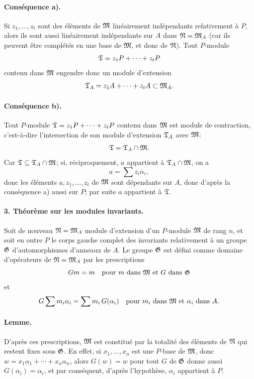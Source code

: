 \paragraph{Conséquence a).}
Si \(z_1,\ldots,z_t\) sont des éléments de \(\mathfrak M\) linéairement indépendants relativement à \(P\), alors ils sont aussi linéairement indépendants sur \(A\) dans \(\mathfrak N=\mathfrak M_A\) (car ils peuvent être complétés en une base de \(\mathfrak M\), et donc de \(\mathfrak N\)). Tout \(P\)-module
\[
        \mathfrak T=z_1P+\cdots+z_tP
\]
contenu dans \(\mathfrak M\) engendre donc un module d'extension
\[
        \mathfrak T_A=z_1A+\cdots+z_tA\subset \mathfrak M_A.
\]

\paragraph{Conséquence b).}
Tout \(P\)-module \(\mathfrak T=z_1P+\cdots+z_tP\) contenu dans \(\mathfrak M\) est module de contraction, c'est-à-dire l'intersection de son module d'extension \(\mathfrak T_A\) avec \(\mathfrak M\):
\[
        \mathfrak T=\mathfrak T_A\cap\mathfrak M .
\]
Car \(\mathfrak T\subseteq \mathfrak T_A\cap\mathfrak M\); si, réciproquement, \(a\) appartient à \(\mathfrak T_A\cap\mathfrak M\), on a
\[
        a=\sum z_i\alpha_i,
\]
donc les éléments \(a,z_1,\ldots,z_t\) de \(\mathfrak M\) sont dépendants sur \(A\), donc d'après la conséquence a) aussi sur \(P\); par suite \(a\) appartient à \(\mathfrak T\).

\paragraph{3. Théorème sur les modules invariants.}
Soit de nouveau \(\mathfrak N=\mathfrak M_A\) module d'extension d'un \(P\)-module \(\mathfrak M\) de rang \(n\), et soit en outre \(P\) le corps gauche complet des invariants relativement à un groupe \(\mathfrak G\) d'automorphismes d'anneaux de \(A\). Le groupe \(\mathfrak G\) est défini comme domaine d'opérateurs de \(\mathfrak N=\mathfrak M_A\) par les prescriptions
\[
        Gm=m\quad\text{pour }m\text{ dans }\mathfrak M\text{ et }G\text{ dans }\mathfrak G
\]
et
\[
        G\sum m_i\alpha_i=\sum m_i\,G(\alpha_i)
        \quad\text{pour }m_i\text{ dans }\mathfrak M\text{ et }\alpha_i\text{ dans }A.
\]

\paragraph{Lemme.}
D'après ces prescriptions, \(\mathfrak M\) est constitué par la totalité des éléments de \(\mathfrak N\) qui restent fixes sous \(\mathfrak G\). En effet, si \(x_1,\ldots,x_n\) est une \(P\)-base de \(\mathfrak M\), donc \(w=x_1\alpha_1+\cdots+x_n\alpha_n\), alors \(G(w)=w\) pour tout \(G\) de \(\mathfrak G\) donne aussi \(G(\alpha_i)=\alpha_i\), et par conséquent, d'après l'hypothèse, \(\alpha_i\) appartient à \(P\).

